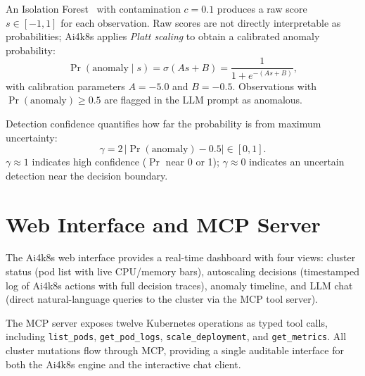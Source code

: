 An Isolation Forest~\cite{liu2008isolation} with contamination $c=0.1$ produces
a raw score $s \in [-1,1]$ for each observation. Raw scores are not directly
interpretable as probabilities; Ai4k8s applies \emph{Platt scaling} to obtain
a calibrated anomaly probability:
\begin{equation}
  \Pr(\text{anomaly} \mid s)
    = \sigma(As + B)
    = \frac{1}{1 + e^{-(As + B)}},
  \label{eq:platt}
\end{equation}
with calibration parameters $A = -5.0$ and $B = -0.5$. Observations with
$\Pr(\text{anomaly}) \ge 0.5$ are flagged in the LLM prompt as anomalous.

Detection confidence quantifies how far the probability is from maximum
uncertainty:
\begin{equation}
  \gamma = 2\,\bigl|\Pr(\text{anomaly}) - 0.5\bigr| \in [0,1].
  \label{eq:confidence}
\end{equation}
$\gamma \approx 1$ indicates high confidence ($\Pr$ near 0 or 1); $\gamma \approx 0$
indicates an uncertain detection near the decision boundary.

\section{Web Interface and MCP Server}
\label{sec:web-mcp}

The Ai4k8s web interface provides a real-time dashboard with four views:
cluster status (pod list with live CPU/memory bars), autoscaling decisions
(timestamped log of Ai4k8s actions with full decision traces), anomaly timeline,
and LLM chat (direct natural-language queries to the cluster via the MCP tool
server).

The \gls{MCP} server exposes twelve Kubernetes operations as typed tool calls,
including \texttt{list\_pods}, \texttt{get\_pod\_logs}, \texttt{scale\_deployment},
and \texttt{get\_metrics}. All cluster mutations flow through MCP, providing a
single auditable interface for both the Ai4k8s engine and the interactive chat
client.
